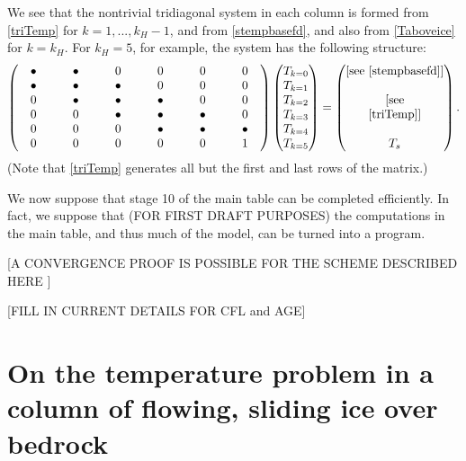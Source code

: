 \documentclass[12pt,final]{amsart}%
\theoremstyle{plain}
\theoremstyle{definition}
\theoremstyle{remark}
\begin{document}
We see that the nontrivial tridiagonal system in each column is formed from \eqref{triTemp} for $k=1,...,k_H-1$, and from \eqref{stempbasefd}, and also from \eqref{Taboveice} for $k=k_H$.  For $k_H=5$, for example, the system has the following structure:
\newcommand{\bul}{\bullet}
    $$\begin{pmatrix} \quad \bul \quad & \quad \bul \quad & \quad 0 \quad & \quad 0 \quad & \quad 0 \quad & \quad 0 \quad \\ \bul &\bul & \bul & 0 & 0 & 0 \\ 0 & \bul & \bul & \bul & 0 & 0 \\ 0 & 0 & \bul & \bul & \bul & 0 \\ 0 & 0 & 0 & \bul & \bul & \bul \\ 0 & 0 & 0 & 0 & 0 & 1 \end{pmatrix} \begin{pmatrix} T_{k=0} \\ T_{k=1} \\ T_{k=2} \\ T_{k=3} \\ T_{k=4} \\ T_{k=5} \end{pmatrix}  =  \begin{pmatrix} [\text{see \eqref{stempbasefd}}] \\  \\ [\text{see} \\ \eqref{triTemp}] \\  \\ T_s \end{pmatrix}.$$
(Note that \eqref{triTemp} generates all but the first and last rows of the matrix.)

We now suppose that stage 10 of the main table can be completed efficiently.  In fact, we suppose that (FOR FIRST DRAFT PURPOSES) the computations in the main table, and thus much of the model, can be turned into a program.

[A CONVERGENCE PROOF IS POSSIBLE FOR THE SCHEME DESCRIBED HERE \citep{BBL}]

[FILL IN CURRENT DETAILS FOR CFL and AGE]






\newpage
\section{On the temperature problem in a column of flowing, sliding ice over bedrock}
\end{document}
